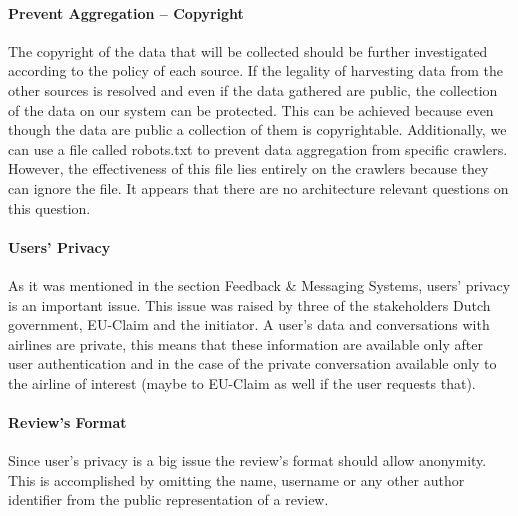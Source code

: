 \documentclass{article}
\begin{document}
\paragraph{Prevent Aggregation – Copyright} The copyright of the data that will be collected should be further investigated according to the policy of each source. If the legality of 
harvesting data from the other sources is resolved and even if the data gathered are public, the collection of the data on our system can be protected. This can be achieved because 
even though the data are public a collection of them is copyrightable. Additionally, we can use a file called robots.txt to prevent data aggregation from specific crawlers. However, 
the effectiveness of this file lies entirely on the crawlers because they can ignore the file. It appears that there are no architecture relevant questions on this question.

\paragraph{Users' Privacy} As it was mentioned in the section Feedback \& Messaging Systems, users' privacy is an important issue. This issue was raised by three of the stakeholders 
Dutch government, EU-Claim and the initiator. A user's data and conversations with airlines are private, this means that these information are available only after user authentication 
and in the case of the private conversation available only to the airline of interest (maybe to EU-Claim as well if the user requests that). 

\paragraph{Review's Format} Since user's privacy is a big issue the review's format should allow anonymity. This is accomplished by omitting the name, username or any other author 
identifier from the public representation of a review.


\end{document}
